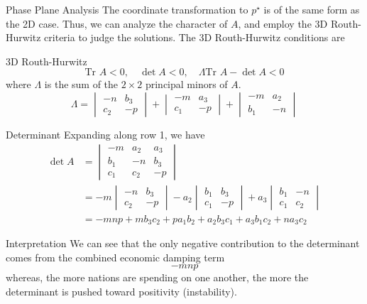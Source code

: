 \documentclass{beamer}
\begin{document}
\begin{frame}{Phase Plane Analysis}
  The coordinate transformation to $p^\star$ is of the same form as the 2D case. Thus, we can analyze the character of $A$, and employ the 3D Routh-Hurwitz criteria to judge the solutions. The 3D Routh-Hurwitz conditions are
  \begin{block}{3D Routh-Hurwitz}
  \begin{equation}
    \text{Tr }A<0,\quad \det{A}<0,\quad\Lambda\text{Tr }A-\det{A} <0
  \end{equation}
  where $\Lambda$ is the sum of the $2\times 2$ principal minors of $A$.
  \begin{equation}
    \Lambda = \begin{vmatrix}-n& b_3\\
	       c_2 & -p\end{vmatrix}+\begin{vmatrix}-m & a_3\\ c_1 & -p\end{vmatrix} + \begin{vmatrix}-m & a_2 \\ b_1 & -n\end{vmatrix}
  \end{equation}
    \end{block}
    \end{frame}
    \begin{frame}
\begin{block}{Determinant}
  Expanding along row 1, we have
    \begin{align*}
      \det{A}&=\begin{vmatrix}
      -m & a_{2} & a_{3} \\
      b_1 & -n & b_3 \\
      c_1 & c_2 & -p
      \end{vmatrix}\\
	     &= -m\begin{vmatrix}-n& b_3\\
	       c_2 & -p\end{vmatrix}-a_2\begin{vmatrix}b_1 & b_3\\ c_1 & -p\end{vmatrix}+ a_3\begin{vmatrix}b_1 & -n \\ c_1 & c_2\end{vmatrix}\\
		   &= -mnp +mb_3 c_2 + pa_1 b_2 + a_2 b_3 c_1 + a_3 b_1 c_2 + n a_3 c_ 2
    \end{align*}
\end{block}
\begin{block}{Interpretation}
  We can see that the only negative contribution to the determinant comes from the combined economic damping term 
  \[-mnp\]
  whereas, the more nations are spending on one another, the more the determinant is pushed toward positivity (instability).
\end{block}
\end{frame}
\end{document}
